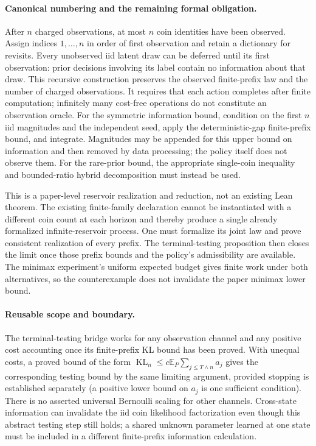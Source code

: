 \paragraph{Canonical numbering and the remaining formal obligation.}
After $n$ charged observations, at most $n$ coin identities have been observed.
Assign indices $1,\ldots,n$ in order of first observation and retain a dictionary
for revisits. Every unobserved iid latent draw can be deferred until its first
observation: prior decisions involving its label contain no information about
that draw. This recursive construction preserves the observed finite-prefix law
and the number of charged observations. It requires that each action completes
after finite computation; infinitely many cost-free operations do not constitute
an observation oracle. For the symmetric information bound, condition on the
first $n$ iid magnitudes and the independent seed, apply the deterministic-gap
finite-prefix bound, and integrate. Magnitudes may be appended for this upper
bound on information and then removed by data processing; the policy itself
does not observe them. For the rare-prior bound, the appropriate single-coin
inequality and bounded-ratio hybrid decomposition must instead be used.

This is a paper-level reservoir realization and reduction, not an existing Lean
theorem. The existing finite-family declaration cannot be instantiated with a
different coin count at each horizon and thereby produce a single already
formalized infinite-reservoir process. One must formalize its joint law and
prove consistent realization of every prefix. The terminal-testing proposition
then closes the limit once those prefix bounds and the policy's admissibility
are available. The minimax experiment's uniform expected budget gives finite
work under both alternatives, so the counterexample does not invalidate the
paper minimax lower bound.

\paragraph{Reusable scope and boundary.}
The terminal-testing bridge works for any observation channel and any positive
cost accounting once its finite-prefix KL bound has been proved. With unequal
costs, a proved bound of the form
$\operatorname{KL}_n\le c\mathbb E_P\sum_{j\le T\wedge n}a_j$
gives the corresponding testing bound by the same limiting argument, provided
stopping is established separately (a positive lower bound on $a_j$ is one
sufficient condition). There is no asserted universal Bernoulli scaling for
other channels. Cross-state information can invalidate the iid coin likelihood
factorization even though this abstract testing step still holds; a shared
unknown parameter learned at one state must be included in a different
finite-prefix information calculation.
